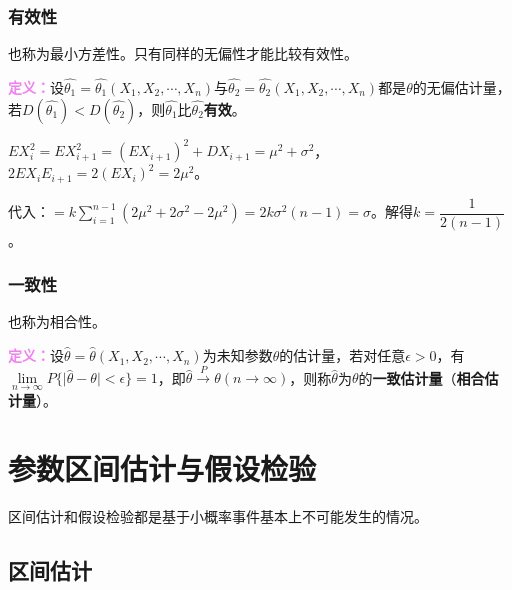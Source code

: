 \subsubsection{有效性}

也称为最小方差性。只有同样的无偏性才能比较有效性。

\textcolor{violet}{\textbf{定义：}}设$\hat{\theta_1}=\hat{\theta_1}(X_1,X_2,\cdots,X_n)$与$\hat{\theta_2}=\hat{\theta_2}(X_1,X_2,\cdots,X_n)$都是$\theta$的无偏估计量，若$D(\hat{\theta_1})<D(\hat{\theta_2})$，则$\hat{\theta_1}$比$\hat{\theta_2}$\textbf{有效}。

$EX_i^2=EX_{i+1}^2=(EX_{i+1})^2+DX_{i+1}=\mu^2+\sigma^2$，$2EX_iE_{i+1}=2(EX_i)^2=2\mu^2$。

代入：$=k\sum\limits_{i=1}^{n-1}(2\mu^2+2\sigma^2-2\mu^2)=2k\sigma^2(n-1)=\sigma$。解得$k=\dfrac{1}{2(n-1)}$。

\subsubsection{一致性}

也称为相合性。

\textcolor{violet}{\textbf{定义：}}设$\hat{\theta}=\hat{\theta}(X_1,X_2,\cdots,X_n)$为未知参数$\theta$的估计量，若对任意$\epsilon>0$，有$\lim\limits_{n\to\infty}P\{\vert\hat{\theta}-\theta\vert<\epsilon\}=1$，即$\hat{\theta}\overset{P}{\longrightarrow}\theta(n\to\infty)$，则称$\hat{\theta}$为$\theta$的\textbf{一致估计量}（\textbf{相合估计量}）。

\section{参数区间估计与假设检验}



区间估计和假设检验都是基于小概率事件基本上不可能发生的情况。

\subsection{区间估计}

